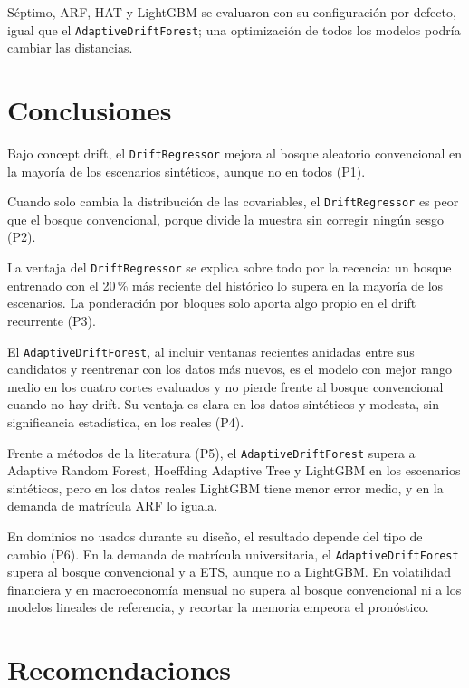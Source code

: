 \documentclass[11pt,a4paper]{article}
\begin{document}
Séptimo, ARF, HAT y LightGBM se evaluaron con su configuración por defecto, igual que el
\texttt{AdaptiveDriftForest}; una optimización de todos los modelos podría cambiar las distancias.

\section{Conclusiones}\label{sec:conclusiones}

Bajo concept drift, el \texttt{DriftRegressor} mejora al bosque aleatorio convencional en la mayoría
de los escenarios sintéticos, aunque no en todos (P1).

Cuando solo cambia la distribución de las covariables, el \texttt{DriftRegressor} es peor que el
bosque convencional, porque divide la muestra sin corregir ningún sesgo (P2).

La ventaja del \texttt{DriftRegressor} se explica sobre todo por la recencia: un bosque entrenado con
el 20\,\% más reciente del histórico lo supera en la mayoría de los escenarios. La ponderación por
bloques solo aporta algo propio en el drift recurrente (P3).

El \texttt{AdaptiveDriftForest}, al incluir ventanas recientes anidadas entre sus candidatos y
reentrenar con los datos más nuevos, es el modelo con mejor rango medio en los cuatro cortes evaluados
y no pierde frente al bosque convencional cuando no hay drift. Su ventaja es clara en los datos
sintéticos y modesta, sin significancia estadística, en los reales (P4).

Frente a métodos de la literatura (P5), el \texttt{AdaptiveDriftForest} supera a Adaptive Random Forest,
Hoeffding Adaptive Tree y LightGBM en los escenarios sintéticos, pero en los datos reales LightGBM tiene
menor error medio, y en la demanda de matrícula ARF lo iguala.

En dominios no usados durante su diseño, el resultado depende del tipo de cambio (P6). En la demanda de
matrícula universitaria, el \texttt{AdaptiveDriftForest} supera al bosque convencional y a ETS, aunque no
a LightGBM. En volatilidad financiera y en macroeconomía mensual no supera al bosque convencional ni a los
modelos lineales de referencia, y recortar la memoria empeora el pronóstico.

\section{Recomendaciones}\label{sec:recomendaciones}
\end{document}

